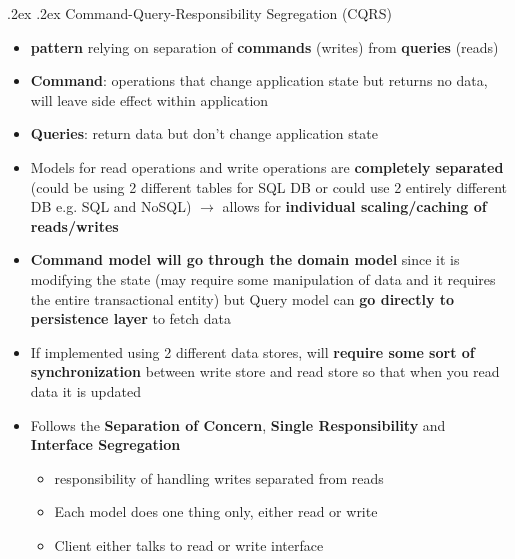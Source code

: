 \documentclass[10pt,landscape,a4paper]{article}
\makeatletter
\renewcommand{\subsection}{\@startsection{subsection}{1}{0mm}%
	{.2ex}%
	{.2ex}%
	{\sffamily\bfseries}}
\makeatother
\begin{document}
\begin{multicols*}{4}
		\subsection{Command-Query-Responsibility Segregation (CQRS)}
		\begin{itemize}
			\item \textbf{pattern} relying on separation of \textbf{commands} (writes) from \textbf{queries} (reads)
			\item \textbf{Command}: operations that change application state but returns no data, will leave side effect within application
			\item \textbf{Queries}: return data but don't change application state
			\item Models for read operations and write operations are \textbf{completely separated} (could be using 2 different tables for SQL DB or could use 2 entirely different DB e.g. SQL and NoSQL) $\rightarrow$ allows for \textbf{individual scaling/caching of reads/writes}
			\item \textbf{Command model will go through the domain model} since it is modifying the state (may require some manipulation of data and it requires the entire transactional entity) but Query model can \textbf{go directly to persistence layer} to fetch data 
			\item If implemented using 2 different data stores, will \textbf{require some sort of synchronization} between write store and read store so that when you read data it is updated
			\item Follows the \textbf{Separation of Concern}, \textbf{Single Responsibility} and \textbf{Interface Segregation}
			\begin{itemize}
				\item responsibility of handling writes separated from reads
				\item Each model does one thing only, either read or write
				\item Client either talks to read or write interface
			\end{itemize}
		\end{itemize}

\end{multicols*}
\end{document}
